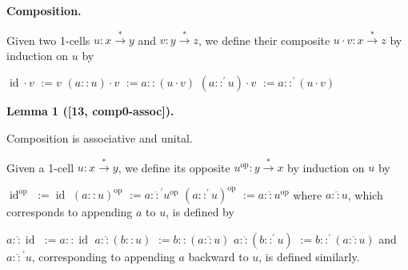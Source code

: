 
 
 
\par\medskip\noindent\textbf{Composition.}\par
 
 
Given two 1-cells $u:x\overset{*}{\to}y$ and $v:y\overset{*}{\to}z$, we define their composite $u\cdot{}v:x\overset{*}{\to}z$ by induction on $u$ by\par
    $\displaystyle\operatorname{id}\cdot{}v$ $\displaystyle:=v$ $\displaystyle(a::u)\cdot{}v$ $\displaystyle:=a::(u\cdot{}v)$ $\displaystyle(a::^{\prime}u)\cdot{}v$ $\displaystyle:=a::^{\prime}(u\cdot{}v)$    
 
 
\par\medskip\noindent\textbf{Lemma 1 ([13, comp0-assoc]).}\par
 
 
Composition is associative and unital.\par
 
 
 
 
Given a 1-cell $u:x\overset{*}{\to}y$, we define its opposite $u^{\mathrm{op}}:y\overset{*}{\to}x$ by induction on $u$ by\par
    $\displaystyle\operatorname{id}^{\mathrm{op}}$ $\displaystyle:=\operatorname{id}$ $\displaystyle(a::u)^{\mathrm{op}}$ $\displaystyle:=a\mathbin{\overline{::}^{\prime}}u^{\mathrm{op}}$ $\displaystyle(a::^{\prime}u)^{\mathrm{op}}$ $\displaystyle:=a\mathbin{\overline{::}}u^{\mathrm{op}}$    
where $a\mathbin{\overline{::}}u$, which corresponds to appending $a$ to $u$, is defined by\par
    $\displaystyle a\mathbin{\overline{::}}\operatorname{id}$ $\displaystyle:=a::\operatorname{id}$ $\displaystyle a\mathbin{\overline{::}}(b::u)$ $\displaystyle:=b::(a\mathbin{\overline{::}}u)$ $\displaystyle a\mathbin{\overline{::}}(b::^{\prime}u)$ $\displaystyle:=b::^{\prime}(a\mathbin{\overline{::}}u)$    
and $a\mathbin{\overline{::}^{\prime}}u$, corresponding to appending $a$ backward to $u$, is defined similarly.\par
 
